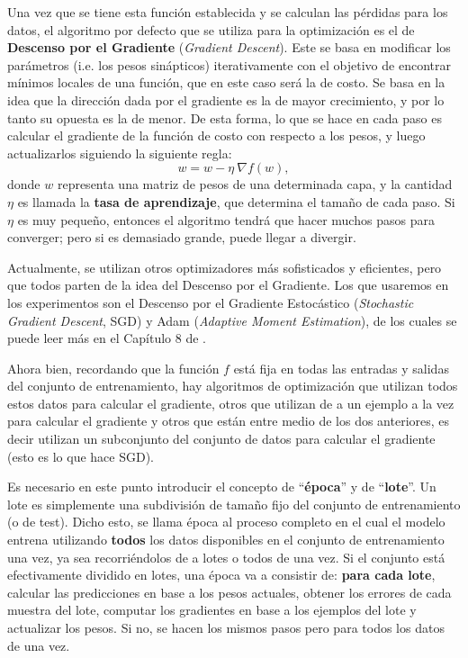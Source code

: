 \documentclass[aps,twocolumn,groupedaddress]{revtex4-2}
\begin{document}
Una vez que se tiene esta función establecida y se calculan las pérdidas para los datos, el algoritmo por defecto que se utiliza para la optimización es el de \textbf{Descenso por el Gradiente} (\textit{Gradient Descent}). Este se basa en modificar los parámetros (i.e. los pesos sinápticos) iterativamente con el objetivo de encontrar mínimos locales de una función, que en este caso será la de costo. Se basa en la idea que la dirección dada por el gradiente es la de mayor crecimiento, y por lo tanto su opuesta es la de menor. De esta forma, lo que se hace en cada paso es calcular el gradiente de la función de costo con respecto a los pesos, y luego actualizarlos siguiendo la siguiente regla:
\[
w = w - \eta \ \nabla f(w),
\]
donde \(w\) representa una matriz de pesos de una determinada capa, y la cantidad \(\eta\) es llamada la \textbf{tasa de aprendizaje}, que determina el tamaño de cada paso. Si \(\eta\) es muy pequeño, entonces el algoritmo tendrá que hacer muchos pasos para converger; pero si es demasiado grande, puede llegar a divergir. 

Actualmente, se utilizan otros optimizadores más sofisticados y eficientes, pero que todos parten de la idea del Descenso por el Gradiente. Los que usaremos en los experimentos son el Descenso por el Gradiente Estocástico (\textit{Stochastic Gradient Descent}, SGD) y Adam (\textit{Adaptive Moment Estimation}), de los cuales se puede leer más en el Capítulo 8 de \cite{deep-learning}.

Ahora bien, recordando que la función \(f\) está fija en todas las entradas y salidas del conjunto de entrenamiento, hay algoritmos de optimización que utilizan todos estos datos para  calcular el gradiente, otros que utilizan de a un ejemplo a la vez para calcular el gradiente y otros que están entre medio de los dos anteriores, es decir utilizan un subconjunto del conjunto de datos para calcular el gradiente (esto es lo que hace SGD). 

Es necesario en este punto introducir el concepto de ``\textbf{época}'' y de ``\textbf{lote}''. Un lote es simplemente una subdivisión de tamaño fijo del conjunto de entrenamiento (o de test). Dicho esto, se llama época al proceso completo en el cual el modelo entrena utilizando \textbf{todos} los datos disponibles en el conjunto de entrenamiento una vez, ya sea recorriéndolos de a lotes o todos de una vez. Si el conjunto está efectivamente dividido en lotes, una época va a consistir de: \textbf{para cada lote}, calcular las predicciones en base a los pesos actuales, obtener los errores de cada muestra del lote, computar los gradientes en base a los ejemplos del lote y actualizar los pesos. Si no, se hacen los mismos pasos pero para todos los datos de una vez.
\end{document}
